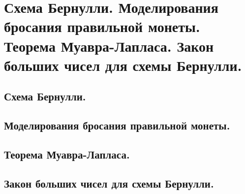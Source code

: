 \section{Схема Бернулли. Моделирования бросания правильной монеты. Теорема Муавра-Лапласа. Закон больших чисел для схемы Бернулли.}

\subsection{Схема Бернулли.}

\subsection{Моделирования бросания правильной монеты.}

\subsection{Теорема Муавра-Лапласа.}

\subsection{Закон больших чисел для схемы Бернулли.}